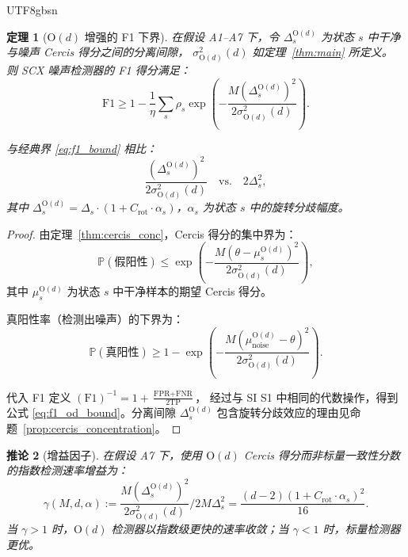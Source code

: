 \documentclass[12pt,a4paper]{article}
\theoremstyle{plain}
\newtheorem{theorem}{定理}[section]
\newtheorem{corollary}[theorem]{推论}
\theoremstyle{definition}
\theoremstyle{remark}
\newcommand{\Pbb}{\mathbb{P}}
\newcommand{\Od}{\mathrm{O}(d)}
\begin{document}
\begin{CJK}{UTF8}{gbsn}
\begin{theorem}[$\Od$ 增强的 F1 下界]\label{thm:f1_od}
在假设 A1--A7 下，令 $\Delta_s^{\Od}$ 为状态 $s$ 中干净与噪声 Cercis 得分之间的分离间隙，
$\sigma_{\Od}^2(d)$ 如定理~\ref{thm:main} 所定义。
则 SCX 噪声检测器的 F1 得分满足：
\begin{equation}\label{eq:f1_od_bound}
    \mathrm{F1} \geq 1 - \frac{1}{\eta}\sum_{s} \rho_s \exp\!\left(-\frac{M (\Delta_s^{\Od})^2}{2\sigma_{\Od}^2(d)}\right).
\end{equation}

与经典界 \eqref{eq:f1_bound} 相比：
\begin{equation}
    \frac{(\Delta_s^{\Od})^2}{2\sigma_{\Od}^2(d)} \quad \text{vs.} \quad 2\Delta_s^2,
\end{equation}
其中 $\Delta_s^{\Od} = \Delta_s \cdot (1 + C_{\text{rot}} \cdot \alpha_s)$，$\alpha_s$ 为状态 $s$ 中的旋转分歧幅度。
\end{theorem}

\begin{proof}
由定理~\ref{thm:cercis_conc}，Cercis 得分的集中界为：
\begin{equation}
    \Pbb(\text{假阳性}) \leq \exp\!\left(-\frac{M(\theta - \mu_s^{\Od})^2}{2\sigma_{\Od}^2(d)}\right),
\end{equation}
其中 $\mu_s^{\Od}$ 为状态 $s$ 中干净样本的期望 Cercis 得分。

真阳性率（检测出噪声）的下界为：
\begin{equation}
    \Pbb(\text{真阳性}) \geq 1 - \exp\!\left(-\frac{M(\mu_{\text{noise}}^{\Od} - \theta)^2}{2\sigma_{\Od}^2(d)}\right).
\end{equation}

代入 F1 定义 $(\mathrm{F1})^{-1} = 1 + \frac{\text{FPR} + \text{FNR}}{2\text{TP}}$，
经过与 SI S1 中相同的代数操作，得到公式 \eqref{eq:f1_od_bound}。分离间隙 $\Delta_s^{\Od}$ 包含旋转分歧效应的理由见命题~\ref{prop:cercis_concentration}。
\end{proof}

\begin{corollary}[增益因子]\label{cor:gain}
在假设 A7 下，使用 $\Od$ Cercis 得分而非标量一致性分数的指数检测速率增益为：
\begin{equation}
    \gamma(M, d, \alpha) := \frac{M (\Delta_s^{\Od})^2}{2\sigma_{\Od}^2(d)} \bigg/ 2M\Delta_s^2
    = \frac{(d-2)(1 + C_{\text{rot}} \cdot \alpha_s)^2}{16}.
\end{equation}
当 $\gamma > 1$ 时，$\Od$ 检测器以指数级更快的速率收敛；当 $\gamma < 1$ 时，标量检测器更优。
\end{corollary}


\end{CJK}
\end{document}
